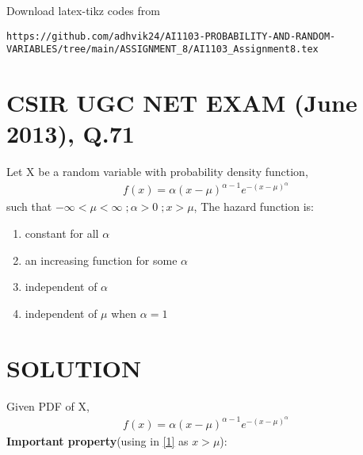 \documentclass[journal,12pt,twocolumn]{IEEEtran}
\begin{document}
%
Download latex-tikz codes from 
%
\begin{lstlisting}
https://github.com/adhvik24/AI1103-PROBABILITY-AND-RANDOM-VARIABLES/tree/main/ASSIGNMENT_8/AI1103_Assignment8.tex
\end{lstlisting}
\section{ CSIR UGC NET EXAM (June  2013), Q.71}
Let X be a random variable with probability density function,
\begin{align}
    f(x)=\alpha(x-\mu)^{\alpha-1}e^{-(x-\mu)^{\alpha}}
\end{align}
such that $-\infty<\mu<\infty\;;\alpha>0\;;x>\mu$, The hazard function is: 
\begin{enumerate}
    \item constant for all $\alpha$
    \item an increasing function for some $\alpha$
    \item independent of $\alpha$
    \item independent of $\mu$ when $\alpha=1$
\end{enumerate}
\section{SOLUTION}
Given PDF of X,
\begin{align}
    f(x)=\alpha(x-\mu)^{\alpha-1}e^{-(x-\mu)^{\alpha}}\label{3}
\end{align}
\textbf{Important property}(using in \eqref{1} as $x>\mu$):
\end{document}
